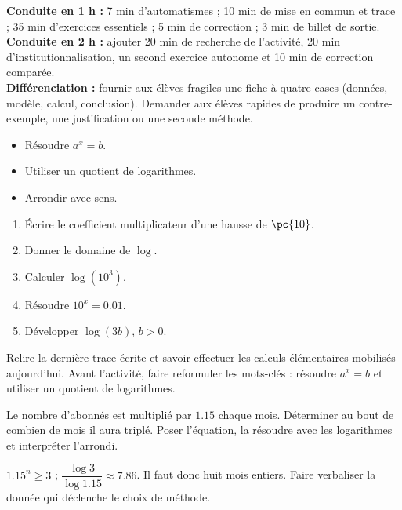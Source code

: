 \ifmxteacher
\begin{method}
\textbf{Conduite en 1 h :} 7 min d'automatismes ; 10 min de mise en commun et trace ; 35 min d'exercices essentiels ; 5 min de correction ; 3 min de billet de sortie.\\
\textbf{Conduite en 2 h :} ajouter 20 min de recherche de l'activité, 20 min d'institutionnalisation, un second exercice autonome et 10 min de correction comparée.\\
\textbf{Différenciation :} fournir aux élèves fragiles une fiche à quatre cases (données, modèle, calcul, conclusion). Demander aux élèves rapides de produire un contre-exemple, une justification ou une seconde méthode.
\end{method}
\fi
{}
\begin{objectives}\begin{itemize}\item Résoudre $a^x=b$.\item Utiliser un quotient de logarithmes.\item Arrondir avec sens.\end{itemize}\end{objectives}
\begin{fluency}\begin{enumerate}\item Écrire le coefficient multiplicateur d'une hausse de $\pc{10}$. \item Donner le domaine de $\log$. \mxblank{$]0,+\infty[$}\item Calculer $\log(10^3)$. \item Résoudre $10^x=\num{0,01}$. \item Développer $\log(3b)$, $b>0$. \end{enumerate}\end{fluency}
\begin{prerequisites}Relire la dernière trace écrite et savoir effectuer les calculs élémentaires mobilisés aujourd'hui. Avant l'activité, faire reformuler les mots-clés : résoudre $a^x=b$ et utiliser un quotient de logarithmes.\end{prerequisites}

\begin{activity}
Le nombre d'abonnés est multiplié par $\num{1,15}$ chaque mois. Déterminer au bout de combien de mois il aura triplé. Poser l'équation, la résoudre avec les logarithmes et interpréter l'arrondi.

\end{activity}
\begin{solution}$\num{1,15}^n\geq3$ ; $\dfrac{\log3}{\log\num{1,15}}\approx\num{7,86}$. Il faut donc huit mois entiers. Faire verbaliser la donnée qui déclenche le choix de méthode.\end{solution}

